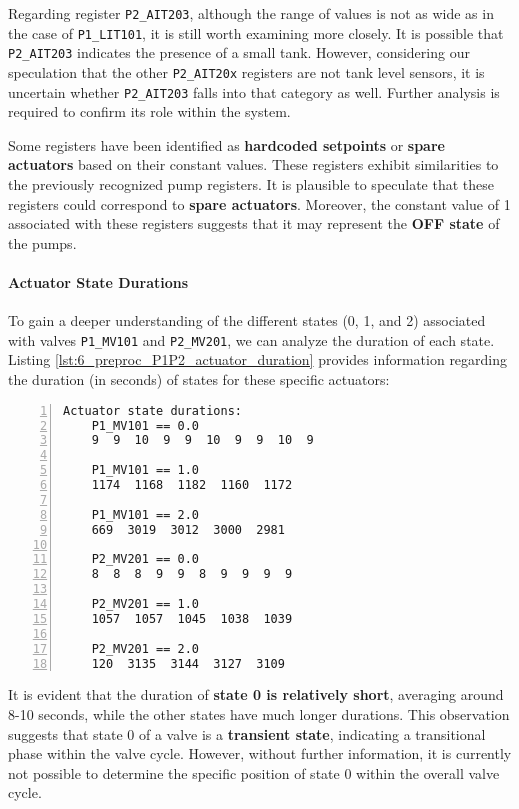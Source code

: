 Regarding register \texttt{P2\_AIT203}, although the range of values is not as wide as in the case of \texttt{P1\_LIT101}, it is still worth examining more closely. It is possible that \texttt{P2\_AIT203} indicates the presence of a small tank. However, considering our speculation that the other \texttt{P2\_AIT20x} registers are not tank level sensors, it is uncertain whether \texttt{P2\_AIT203} falls into that category as well. Further analysis is required to confirm its role within the system.

\bigskip
Some registers have been identified as \textbf{hardcoded setpoints} or \textbf{spare actuators} based on their constant values. These registers exhibit similarities to the previously recognized pump registers. It is plausible to speculate that these registers could correspond to \textbf{spare actuators}. Moreover, the constant value of 1 associated with these registers suggests that it may represent the \textbf{OFF state} of the pumps. 

\paragraph{Actuator State Durations}
\label{par:6_P1P2_actuators_duration}
To gain a deeper understanding of the different states (0, 1, and 2) associated with valves \texttt{P1\_MV101} and \texttt{P2\_MV201}, we can analyze the duration of each state. Listing \ref{lst:6_preproc_P1P2_actuator_duration} provides information regarding the duration (in seconds) of states for these specific actuators:

\begin{lstlisting}[language=bash, numbers=left, caption=Time duration of the states of actuators \texttt{P1\_MV101} and \texttt{P1\_MV201} of PLC1-2, label=lst:6_preproc_P1P2_actuator_duration]
	Actuator state durations:
	P1_MV101 == 0.0
	9  9  10  9  9  10  9  9  10  9
	
	P1_MV101 == 1.0
	1174  1168  1182  1160  1172
	
	P1_MV101 == 2.0
	669  3019  3012  3000  2981
	
	P2_MV201 == 0.0
	8  8  8  9  9  8  9  9  9  9
	
	P2_MV201 == 1.0
	1057  1057  1045  1038  1039
	
	P2_MV201 == 2.0
	120  3135  3144  3127  3109
\end{lstlisting}

It is evident that the duration of \textbf{state 0 is relatively short}, averaging around 8-10 seconds, while the other states have much longer durations. This observation suggests that state 0 of a valve is a \textbf{transient state}, indicating a transitional phase within the valve cycle. However, without further information, it is currently not possible to determine the specific position of state 0 within the overall valve cycle.

